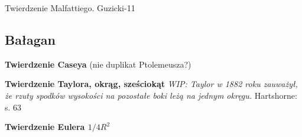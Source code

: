 

Twierdzenie Malfattiego.
Guzicki-11

\subsection{Bałagan}

\textbf{Twierdzenie Caseya} (nie duplikat Ptolemeusza?)

\textbf{Twierdzenie Taylora, okrąg, sześciokąt}
{
    \emph{WIP: Taylor w 1882 roku zauważył, że rzuty spodków wysokości na pozostałe boki leżą na jednym okręgu.}
	Hartshorne: s. 63
}

\textbf{Twierdzenie Eulera $1/4R^2$}



%